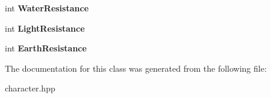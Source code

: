 \begin{DoxyCompactItemize}
\item 
\mbox{\label{classtfp_1_1_character_stats_a27446f202901ac013c41c1d84f4e148a}} 
int {\bfseries Water\+Resistance}
\item 
\mbox{\label{classtfp_1_1_character_stats_a22e81c081bc0bc319db4cacb3008d2ae}} 
int {\bfseries Light\+Resistance}
\item 
\mbox{\label{classtfp_1_1_character_stats_a045ac10e9bd1295a14aa7c0ececd94ae}} 
int {\bfseries Earth\+Resistance}
\end{DoxyCompactItemize}


The documentation for this class was generated from the following file\+:\begin{DoxyCompactItemize}
\item 
character.\+hpp\end{DoxyCompactItemize}

